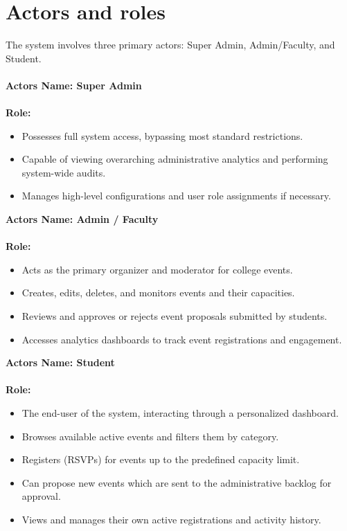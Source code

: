  \section{Actors and roles}
 The system involves three primary actors: Super Admin, Admin/Faculty, and Student.\\\\
\noindent
\textbf{Actors Name: Super Admin}
\\\\
 \textbf{Role:}
 \begin{itemize}
    \item Possesses full system access, bypassing most standard restrictions.
    \item Capable of viewing overarching administrative analytics and performing system-wide audits.
    \item Manages high-level configurations and user role assignments if necessary.
\end{itemize}

\noindent
\textbf{Actors Name: Admin / Faculty}
\\\\
\textbf{Role:}
\begin{itemize}
    \item Acts as the primary organizer and moderator for college events.
    \item Creates, edits, deletes, and monitors events and their capacities.
    \item Reviews and approves or rejects event proposals submitted by students.
    \item Accesses analytics dashboards to track event registrations and engagement.
\end{itemize}

\noindent
\textbf{Actors Name: Student}
\\\\
\textbf{Role:}
\begin{itemize}
    \item The end-user of the system, interacting through a personalized dashboard.
    \item Browses available active events and filters them by category.
    \item Registers (RSVPs) for events up to the predefined capacity limit.
    \item Can propose new events which are sent to the administrative backlog for approval.
    \item Views and manages their own active registrations and activity history.
\end{itemize}
